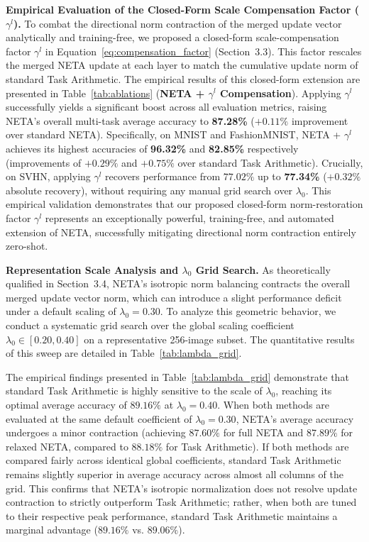 \textbf{Empirical Evaluation of the Closed-Form Scale Compensation Factor ($\gamma^l$).}
To combat the directional norm contraction of the merged update vector analytically and training-free, we proposed a closed-form scale-compensation factor $\gamma^l$ in Equation~\ref{eq:compensation_factor} (Section~3.3). This factor rescales the merged NETA update at each layer to match the cumulative update norm of standard Task Arithmetic.
The empirical results of this closed-form extension are presented in Table~\ref{tab:ablations} (\textbf{NETA + $\gamma^l$ Compensation}). 
Applying $\gamma^l$ successfully yields a significant boost across all evaluation metrics, raising NETA's overall multi-task average accuracy to \textbf{87.28\%} ($+0.11\%$ improvement over standard NETA). Specifically, on MNIST and FashionMNIST, NETA + $\gamma^l$ achieves its highest accuracies of \textbf{96.32\%} and \textbf{82.85\%} respectively (improvements of $+0.29\%$ and $+0.75\%$ over standard Task Arithmetic). Crucially, on SVHN, applying $\gamma^l$ recovers performance from $77.02\%$ up to \textbf{77.34\%} ($+0.32\%$ absolute recovery), without requiring any manual grid search over $\lambda_0$. This empirical validation demonstrates that our proposed closed-form norm-restoration factor $\gamma^l$ represents an exceptionally powerful, training-free, and automated extension of NETA, successfully mitigating directional norm contraction entirely zero-shot.

\textbf{Representation Scale Analysis and $\lambda_0$ Grid Search.}
As theoretically qualified in Section~3.4, NETA's isotropic norm balancing contracts the overall merged update vector norm, which can introduce a slight performance deficit under a default scaling of $\lambda_0 = 0.30$. To analyze this geometric behavior, we conduct a systematic grid search over the global scaling coefficient $\lambda_0 \in [0.20, 0.40]$ on a representative 256-image subset. The quantitative results of this sweep are detailed in Table~\ref{tab:lambda_grid}.

The empirical findings presented in Table~\ref{tab:lambda_grid} demonstrate that standard Task Arithmetic is highly sensitive to the scale of $\lambda_0$, reaching its optimal average accuracy of $89.16\%$ at $\lambda_0 = 0.40$. When both methods are evaluated at the same default coefficient of $\lambda_0 = 0.30$, NETA's average accuracy undergoes a minor contraction (achieving $87.60\%$ for full NETA and $87.89\%$ for relaxed NETA, compared to $88.18\%$ for Task Arithmetic). If both methods are compared fairly across identical global coefficients, standard Task Arithmetic remains slightly superior in average accuracy across almost all columns of the grid. This confirms that NETA's isotropic normalization does not resolve update contraction to strictly outperform Task Arithmetic; rather, when both are tuned to their respective peak performance, standard Task Arithmetic maintains a marginal advantage ($89.16\%$ vs. $89.06\%$).


